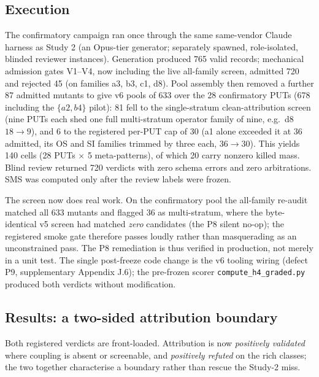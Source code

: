 \documentclass[manuscript,screen,review]{acmart}
\begin{document}
\subsection{Execution}\label{study3-execution}

The confirmatory campaign ran once through the same same-vendor Claude harness
as Study 2 (an Opus-tier generator; separately spawned, role-isolated, blinded
reviewer instances). Generation produced 765 valid records; mechanical
admission gates V1--V4, now including the live all-family screen, admitted 720
and rejected 45 (on families a3, b3, c1, d8). Pool assembly then removed a
further 87 admitted mutants to give v6 pools of 633 over the 28 confirmatory
PUTs (678 including the \(\{a2, b4\}\) pilot): 81 fell to the single-stratum
clean-attribution screen (nine PUTs each shed one full multi-stratum operator
family of nine, e.g.\ d8 \(18 \to 9\)), and 6 to the registered per-PUT cap of
30 (a1 alone exceeded it at 36 admitted, its OS and SI families trimmed by three
each, \(36 \to 30\)). This yields 140 cells (28 PUTs \(\times\) 5
meta-patterns), of which 20 carry nonzero killed mass. Blind review returned 720 verdicts with zero schema errors and zero
arbitrations. SMS was computed only after the review labels were frozen.

The screen now does real work. On the confirmatory pool the all-family re-audit
matched all 633 mutants and flagged 36 as multi-stratum, where the
byte-identical v5 screen had matched \emph{zero} candidates (the P8 silent
no-op); the registered smoke gate therefore passes loudly rather than
masquerading as an unconstrained pass. The P8 remediation is thus verified in
production, not merely in a unit test. The single post-freeze code change is the
v6 tooling wiring (defect P9, supplementary Appendix J.6); the pre-frozen scorer
\texttt{compute\_h4\_graded.py} produced both verdicts without modification.

\subsection{Results: a two-sided attribution boundary}\label{study3-scoreboard}

Both registered verdicts are front-loaded. Attribution is now \emph{positively
validated} where coupling is absent or screenable, and \emph{positively refuted}
on the rich classes; the two together characterise a boundary rather than rescue
the Study-2 miss.
\end{document}

